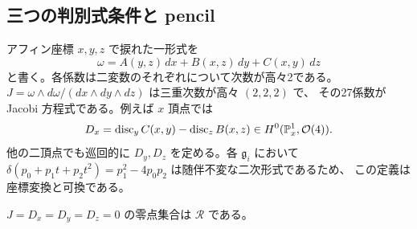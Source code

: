 \subsection{三つの判別式条件と pencil}
アフィン座標 $x,y,z$ で捩れた一形式を
\[
 \omega=A(y,z)\,dx+B(x,z)\,dy+C(x,y)\,dz
\]
と書く。各係数は二変数のそれぞれについて次数が高々2である。
$J=\omega\wedge d\omega/(dx\wedge dy\wedge dz)$ は三重次数が高々 $(2,2,2)$ で、
その27係数が Jacobi 方程式である。例えば $x$ 頂点では
\[
 D_x=\operatorname{disc}_y C(x,y)-\operatorname{disc}_z B(x,z)
 \in H^0(\mathbb P^1_x,\mathcal O(4)).
\]
他の二頂点でも巡回的に $D_y,D_z$ を定める。各 $\mathfrak g_i$ において
$\delta(p_0+p_1t+p_2t^2)=p_1^2-4p_0p_2$ は随伴不変な二次形式であるため、
この定義は座標変換と可換である。

\begin{proposition}\label{cube:prop:res}
$J=D_x=D_y=D_z=0$ の零点集合は $\mathcal R$ である。
\end{proposition}
